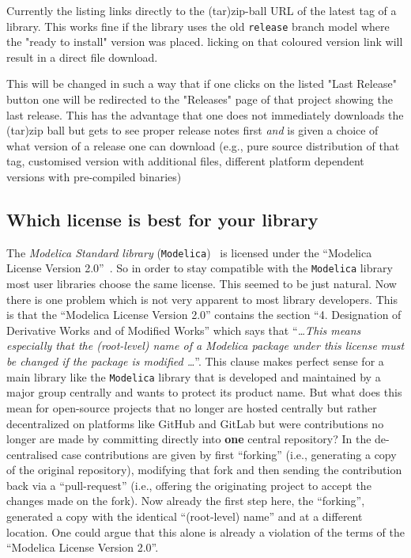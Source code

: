 \documentclass[11pt,a4paper,twocolumn]{article}
\begin{document}
Currently the listing links directly to the (tar)zip-ball URL of the
latest tag of a library. This works fine if the library uses the old
\texttt{release} branch model where the "ready to install" version was
placed.  licking on that coloured version link will result in a direct file download.

This will be changed in such a way that if one clicks on the listed
"Last Release" button one will be redirected to the "Releases" page of
that project showing the last release. This has the advantage that one
does not immediately downloads the (tar)zip ball but gets to see
proper release notes first \emph{and} is given a choice of what
version of a release one can download (e.g., pure source distribution
of that tag, customised version with additional files, different
platform dependent versions with pre-compiled binaries)

\subsection{Which license is best for your library}
The \emph{Modelica Standard library} (\texttt{Modelica})~\parencite{MSL} is licensed under
the ``Modelica License Version 2.0''~\parencite{MoLic2}. So in order
to stay compatible with the \texttt{Modelica} library most user libraries choose the
same license. This seemed to be just natural. Now there is one problem
which is not very apparent to most library developers. This is that
the ``Modelica License Version 2.0'' contains the section
``4. Designation of Derivative Works and of Modified Works'' which
says that ``\emph{\ldots This means especially that the (root-level)
  name of a Modelica package under this license must be changed if the
  package is modified \ldots}''.
This clause makes perfect sense for a main library like the
\texttt{Modelica} library that is developed and maintained by a major
group centrally and wants to protect its product name.
But what does this mean for open-source projects that no longer are
hosted centrally but rather decentralized on platforms like GitHub and
GitLab but were contributions no longer are made by committing
directly into \textbf{one} central repository? In the de-centralised
case contributions are given by first ``forking'' (i.e., generating a
copy of the original repository), modifying that fork and then sending
the contribution back via a ``pull-request'' (i.e., offering the
originating project to accept the changes made on the fork). Now
already the first step here, the ``forking'', generated a copy with the
identical ``(root-level) name'' and at a different location. One could argue that this
alone is already a violation of the terms of the ``Modelica License
Version 2.0''.
\end{document}
